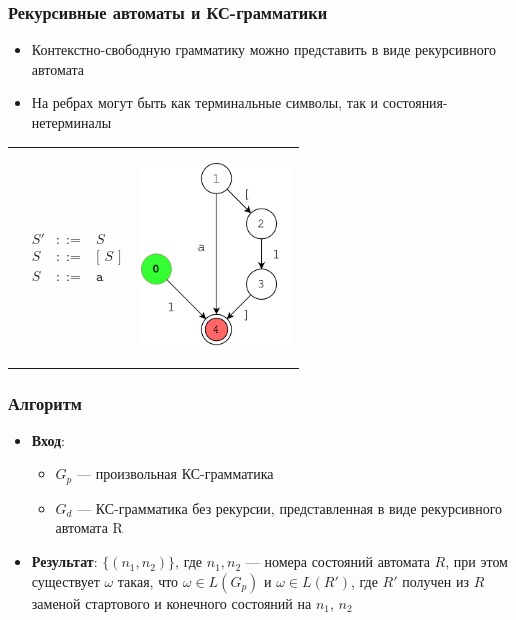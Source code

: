 \documentclass{beamer}
\begin{document}
\begin{frame}
	\transwipe[direction=90]
	\frametitle{Рекурсивные автоматы и КС-грамматики}
	\begin{itemize}
		\item Контекстно-свободную грамматику можно представить в виде рекурсивного автомата
		\item На ребрах могут быть как терминальные символы, так и состояния-нетерминалы
	\end{itemize}
		\begin{table}
			\begin{tabular}{p{5cm} p{5cm}}
				\vspace{15pt}
				$$
				\begin{array}{crcl}
				&S' & ::= & S  \\
				&S  & ::= & \texttt{[ } S \texttt{ ]} \\
				&S  & ::= & \texttt{a}
				\end{array}
				$$
				&
				\vspace{-15pt}
				\begin{center}
					\includegraphics[width=4cm]{pictures/RA}
				\end{center}
			\end{tabular}
		\end{table}
\end{frame}

\begin{frame}
	\transwipe[direction=90]
	\frametitle{Алгоритм}
	\begin{itemize}
		\item \textbf{Вход}:
		\begin{itemize}
			\item $G_p$ --- произвольная КС-грамматика 
			\item $G_d$ --- КС-грамматика без рекурсии, представленная в виде рекурсивного автомата R
		\end{itemize} 
		\item \textbf{Результат}: $\{(n_1, n_2)\}$, где $n_1, n_2$ --- номера состояний автомата $R$, при этом существует $\omega$ такая, что $\omega \in L(G_p)$ и $\omega \in L(R')$, где $R'$ получен из $R$ заменой стартового и конечного состояний на $n_1$, $n_2$
	\end{itemize}
	
\end{frame}
\end{document}
